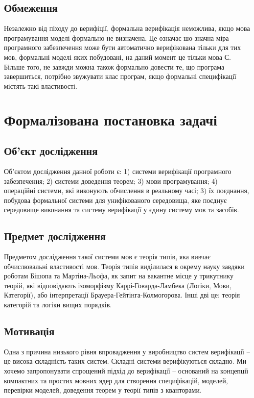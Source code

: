 \documentclass{article}
\begin{document}
\subsection{Обмеження}

Незалежно від піходу до верифіції, формальна верифікація неможлива,
якщо мова програмування моделі формально не визначена. Це означає шо значна міра
програмного забезпечення може бути автоматично верифікована тільки для тих мов,
формальні моделі яких побудовані, на даний момент це тільки мова С.
Більше того, не завжди можна також формально довести те, що програма завершиться,
потрібно звужувати клас програм, якщо формальні специфікації містять такі властивості.

\section{Формалізована постановка задачі}

\subsection{Об'єкт дослідження}

Об'єктом дослідження данної роботи є:
1) системи верифікації програмного забезпечення;
2) системи доведення теорем;
3) мови програмування;
4) операційні системи, які виконують обчислення в реальному часі;
3) їх поєднання, побудова формальної системи для
унифікованого середовища, яке поєднує середовище виконання та систему
верифікації у єдину систему мов та засобів.

\subsection{Предмет дослідження}

Предметом дослідження такої системи мов є теорія типів, яка вивчає обчислювальні властивості мов.
Теорія типів виділилася в окрему науку завдяки роботам Бішопа та Мартіна-Льофа, як запит на вакантне місце у
трикутнику теорій, які відповідають ізоморфізму Каррі-Говарда-Ламбека (Логіки, Мови, Категорії),
або інтерпретації Брауера-Гейтінга-Колмогорова. Інші дві це: теорія категорій та логіки вищих порядків.

\subsection{Мотивація}

Одна з причина низького рівня впровадження у виробництво систем
верифікації -- це висока складність таких систем. Складні системи
верифікуються складно. Ми хочемо запропонувати спрощений
підхід до верифікації -- оснований на концепції компактних
та простих мовних ядер для створення специфікацій, моделей,
перевірки моделей, доведення теорем у теорії типів з кванторами.
\end{document}
